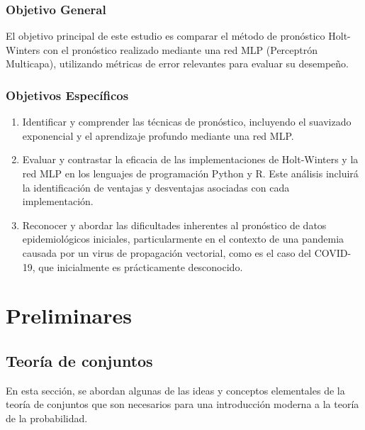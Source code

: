 \documentclass[
  us-letterpaper,
]{scrreprt}
\theoremstyle{plain}
\theoremstyle{definition}
\theoremstyle{definition}
\theoremstyle{plain}
\theoremstyle{remark}
\begin{document}

\section*{Objetivo General}\label{objetivo-general}


El objetivo principal de este estudio es comparar el método de
pronóstico Holt-Winters con el pronóstico realizado mediante una red MLP
(Perceptrón Multicapa), utilizando métricas de error relevantes para
evaluar su desempeño.

\section*{Objetivos Específicos}\label{objetivos-especuxedficos}


\begin{enumerate}
\def\labelenumi{\arabic{enumi}.}
\item
  Identificar y comprender las técnicas de pronóstico, incluyendo el
  suavizado exponencial y el aprendizaje profundo mediante una red MLP.
\item
  Evaluar y contrastar la eficacia de las implementaciones de
  Holt-Winters y la red MLP en los lenguajes de programación Python y R.
  Este análisis incluirá la identificación de ventajas y desventajas
  asociadas con cada implementación.
\item
  Reconocer y abordar las dificultades inherentes al pronóstico de datos
  epidemiológicos iniciales, particularmente en el contexto de una
  pandemia causada por un virus de propagación vectorial, como es el
  caso del COVID-19, que inicialmente es prácticamente desconocido.
\end{enumerate}

\part{Preliminares}

\chapter{Teoría de conjuntos}\label{teoruxeda-de-conjuntos}

En esta sección, se abordan algunas de las ideas y conceptos elementales
de la teoría de conjuntos que son necesarios para una introducción
moderna a la teoría de la probabilidad.
\end{document}
